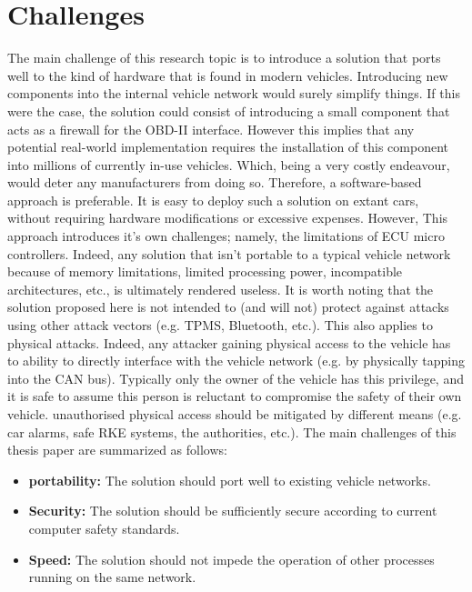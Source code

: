\section{Challenges} \label{sec:challenges}
The main challenge of this research topic is to introduce a solution that ports well to the kind of hardware that is found in modern vehicles. Introducing new components into the internal vehicle network would surely simplify things. If this were the case, the solution could consist of introducing a small component that acts as a firewall for the OBD-II interface. However this implies that any potential real-world implementation requires the installation of this component into millions of currently in-use vehicles. Which, being a very costly endeavour, would deter any manufacturers from doing so. Therefore, a software-based approach is preferable. It is easy to deploy such a solution on extant cars, without requiring hardware modifications or excessive expenses. However, This approach introduces it's own challenges; namely, the limitations of ECU micro controllers. Indeed, any solution that isn't portable to a typical vehicle network because of memory limitations, limited processing power, incompatible architectures, etc., is ultimately rendered useless. It is worth noting that the solution proposed here is not intended to (and will not) protect against attacks using other attack vectors (e.g. TPMS, Bluetooth, etc.). This also applies to physical attacks. Indeed, any attacker gaining physical access to the vehicle has to ability to directly interface with the vehicle network (e.g. by physically tapping into the CAN bus). Typically only the owner of the vehicle has this privilege, and it is safe to assume this person is reluctant to compromise the safety of their own vehicle. unauthorised physical access should be mitigated by different means (e.g. car alarms, safe RKE systems, the authorities, etc.). The main challenges of this thesis paper are summarized as follows:

\begin{itemize}
	\item \textbf{portability:} The solution should port well to existing vehicle networks. 
	\item \textbf{Security:} The solution should be sufficiently secure according to current computer safety standards. 
	\item \textbf{Speed:} The solution should not impede the operation of other processes running on the same network.
\end{itemize}

